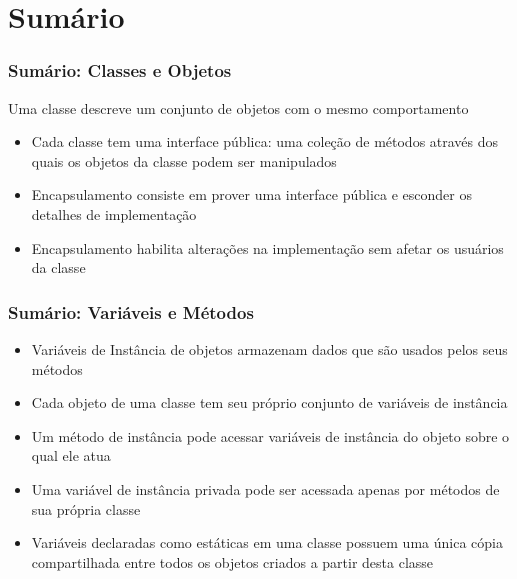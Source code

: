 \documentclass[xcolor={dvipsnames,table},aspectratio=169]{beamer}
\begin{document}
\section{Sumário}

\begin{frame}\frametitle{Sumário: Classes e Objetos}
Uma classe descreve um conjunto de objetos com o mesmo comportamento
\begin{itemize}
	\item Cada classe tem uma interface pública: uma coleção de métodos através dos quais os objetos da classe podem ser manipulados
	\item Encapsulamento consiste em prover uma interface pública e esconder os detalhes de implementação
	\item Encapsulamento habilita alterações na implementação sem afetar os usuários da classe
\end{itemize}
\end{frame}

\begin{frame}\frametitle{Sumário: Variáveis e Métodos}
\begin{itemize}
	\item Variáveis de Instância de objetos armazenam dados que são usados pelos seus métodos
	\item Cada objeto de uma classe tem seu próprio conjunto de variáveis de instância
	\item Um método de instância pode acessar variáveis de instância do objeto sobre o qual ele atua
	\item Uma variável de instância privada pode ser acessada apenas por métodos de sua própria classe
	\item Variáveis declaradas como estáticas em uma classe possuem uma única cópia compartilhada entre todos os objetos criados a partir desta classe
\end{itemize}
\end{frame}
\end{document}
